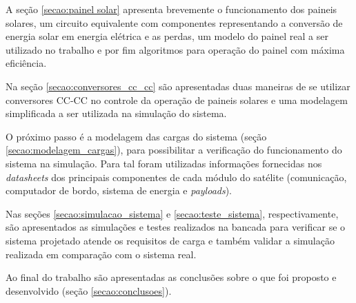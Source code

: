 A seção \ref{secao:painel solar} apresenta brevemente o funcionamento dos paineis solares, um circuito equivalente com componentes representando a conversão de energia solar em energia elétrica e as perdas, um modelo do painel real a ser utilizado no trabalho e por fim algoritmos para operação do painel com máxima eficiência.

Na seção \ref{secao:conversores_cc_cc} são apresentadas duas maneiras de se utilizar conversores CC-CC no controle da operação de paineis solares e uma modelagem simplificada a ser utilizada na simulação do sistema.

O próximo passo é a modelagem das cargas do sistema (seção \ref{secao:modelagem_cargas}), para possibilitar a verificação do funcionamento do sistema na simulação. Para tal foram utilizadas informações fornecidas nos \textit{datasheets} dos principais componentes de cada módulo do satélite (comunicação, computador de bordo, sistema de energia e \textit{payloads}).

Nas seções \ref{secao:simulacao_sistema} e \ref{secao:teste_sistema}, respectivamente, são apresentados as simulações e testes realizados na bancada para verificar se o sistema projetado atende os requisitos de carga e também validar a simulação realizada em comparação com o sistema real.

Ao final do trabalho são apresentadas as conclusões sobre o que foi proposto e desenvolvido (seção \ref{secao:conclusoes}).


